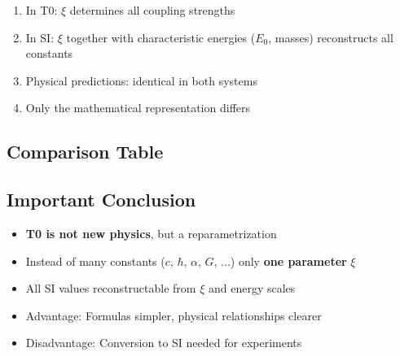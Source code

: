 	\begin{enumerate}
		\item In T0: $\xi$ determines all coupling strengths
		
		\item In SI: $\xi$ together with characteristic energies ($E_0$, masses) reconstructs all constants
		
		\item Physical predictions: identical in both systems
		
		\item Only the mathematical representation differs
	\end{enumerate}
	
	\subsection{Comparison Table}
	
	\begin{table}[h]
		\centering
		\caption{T0 vs. SI - Reconstruction of constants}
	\end{table}
	
	\subsection{Important Conclusion}
	
	\begin{itemize}
		\item \textbf{T0 is not new physics}, but a reparametrization
		
		\item Instead of many constants ($c$, $\hbar$, $\alpha$, $G$, ...) only \textbf{one parameter} $\xi$
		
		\item All SI values reconstructable from $\xi$ and energy scales
		
		\item Advantage: Formulas simpler, physical relationships clearer
		
		\item Disadvantage: Conversion to SI needed for experiments
	\end{itemize}
	
